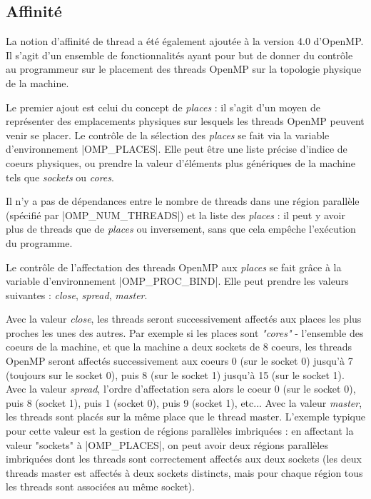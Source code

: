 \subsection{Affinité}

La notion d'affinité de thread a été également ajoutée à la version 4.0 d'OpenMP.
Il s'agit d'un ensemble de fonctionnalités ayant pour but de donner du contrôle au programmeur sur le placement des threads OpenMP sur la topologie physique de la machine.

Le premier ajout est celui du concept de \emph{places} : il s'agit d'un moyen de représenter des emplacements physiques sur lesquels les threads OpenMP peuvent venir se placer.
Le contrôle de la sélection des \emph{places} se fait via la variable d'environnement |OMP_PLACES|.
Elle peut être une liste précise d'indice de coeurs physiques, ou prendre la valeur d'éléments plus génériques de la machine tels que \emph{sockets} ou \emph{cores}.

Il n'y a pas de dépendances entre le nombre de threads dans une région parallèle (spécifié par |OMP_NUM_THREADS|) et la liste des \emph{places} : il peut y avoir plus de threads que de \emph{places} ou inversement, sans que cela empêche l'exécution du programme.

Le contrôle de l'affectation des threads OpenMP aux \emph{places} se fait grâce à la variable d'environnement |OMP_PROC_BIND|.
Elle peut prendre les valeurs suivantes : \emph{close}, \emph{spread}, \emph{master}.

Avec la valeur \emph{close}, les threads seront successivement affectés aux places les plus proches les unes des autres. Par exemple si les places sont \emph{"cores"} - l'ensemble des coeurs de la machine, et que la machine a deux sockets de 8 coeurs, les threads OpenMP seront affectés successivement aux coeurs 0 (sur le socket 0) jusqu'à 7 (toujours sur le socket 0), puis 8 (sur le socket 1) jusqu'à 15 (sur le socket 1).
Avec la valeur \emph{spread}, l'ordre d'affectation sera alors le coeur 0 (sur le socket 0), puis 8 (socket 1), puis 1 (socket 0), puis 9 (socket 1), etc...
Avec la valeur \emph{master}, les threads sont placés sur la même place que le thread master.
L'exemple typique pour cette valeur est la gestion de régions parallèles imbriquées : en affectant la valeur "sockets" à |OMP_PLACES|, on peut avoir deux régions parallèles imbriquées dont les threads sont correctement affectés aux deux sockets (les deux threads master est affectés à deux sockets distincts, mais pour chaque région tous les threads sont associées au même socket).
